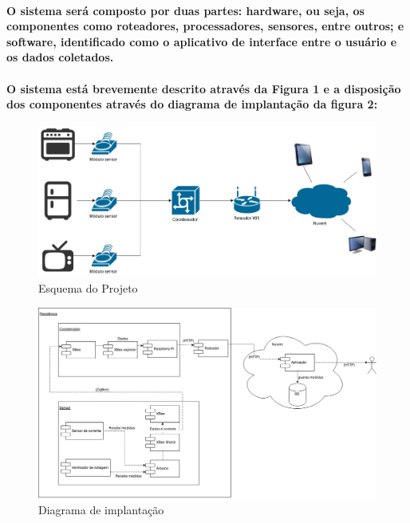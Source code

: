 \label{Cap:especificacao}
\paragraph{
	O sistema será composto por duas partes: hardware, ou seja, os componentes como roteadores, processadores, sensores, entre outros; e software, identificado como o aplicativo de interface entre o usuário e os dados coletados.
}
\paragraph{
	O sistema está brevemente descrito através da Figura 1 e a disposição dos componentes através do diagrama de implantação da figura 2:
}
\begin{figure}
\centering
\includegraphics[width=1\textwidth]{figuras/esqueminha.png}
\caption{\label{fig:esqueminha} Esquema do Projeto}
\end{figure}

\begin{figure}
\centering
\includegraphics[width=1\textwidth]{figuras/diagrama_implantacao.png}
\caption{\label{fig:diagrama_implantacao} Diagrama de implantação}
\end{figure}
